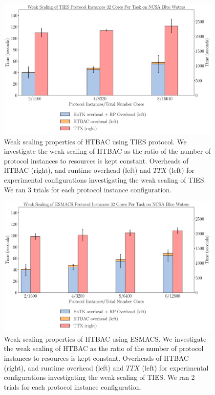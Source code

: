 \begin{figure}
  \centering
    \includegraphics[width=\columnwidth]{figures/new_ws_ties.pdf}
    \caption{Weak scaling properties of HTBAC using TIES protocol. We
    investigate the weak scaling of HTBAC as the ratio of the number of
    protocol instances to resources is kept constant. Overheads of HTBAC
    (right), and runtime overhead (left) and \(TTX\) (left) for experimental
    configurations investigating the weak scaling of TIES. We ran 3 trials
    for each protocol instance configuration.}
\label{fig:weak_scaling_TIES}
\end{figure}

\begin{figure}
  \centering
    \includegraphics[width=\columnwidth]{figures/new_ws_esmacs.pdf}
    \caption{Weak scaling properties of HTBAC using ESMACS. We investigate
    the weak scaling of HTBAC as the ratio of the number of protocol
    instances to resources is kept constant. Overheads of HTBAC (right), and
    runtime overhead (left) and \(TTX\) (left) for experimental
    configurations investigating the weak scaling of TIES. We ran 2 trials
    for each protocol instance configuration.}
\label{fig:weak_scaling_ESMACS}
\end{figure}

